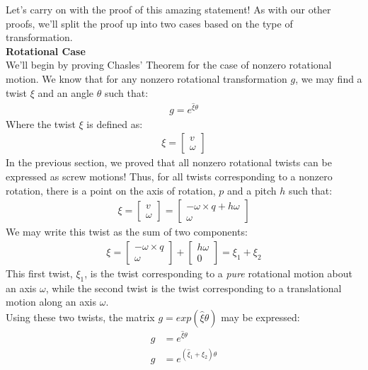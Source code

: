 \documentclass[oneside]{book}
\begin{document}
Let's carry on with the proof of this amazing statement! As with our other proofs, we'll split the proof up into two cases based on the type of transformation.\\
\textbf{Rotational Case}\\
We'll begin by proving Chasles' Theorem for the case of nonzero rotational motion. We know that for any nonzero rotational transformation $g$, we may find a twist $\xi$ and an angle $\theta$ such that:
\begin{align}
    g = e^{\hat\xi\theta}
\end{align}
Where the twist $\xi$ is defined as:
\begin{align}
    \xi = \begin{bmatrix}
    v\\
    \omega
    \end{bmatrix}
\end{align}
In the previous section, we proved that all nonzero rotational twists can be expressed as screw motions! Thus, for all twists corresponding to a nonzero rotation, there is a point on the axis of rotation, $p$ and a pitch $h$ such that:
\begin{align}
    \xi = \begin{bmatrix}
    v\\
    \omega
    \end{bmatrix} = 
    \begin{bmatrix}
    -\omega \times q + h\omega\\
    \omega
    \end{bmatrix}
\end{align}
We may write this twist as the sum of two components:
\begin{align}
    \xi = 
    \begin{bmatrix}
    -\omega \times q\\
    \omega
    \end{bmatrix}
    + \begin{bmatrix}
    h\omega\\
    0
    \end{bmatrix}
    = \xi_1 + \xi_2
\end{align}
This first twist, $\xi_1$, is the twist corresponding to a \textit{pure} rotational motion about an axis $\omega$, while the second twist is the twist corresponding to a translational motion along an axis $\omega$.\\
Using these two twists, the matrix $g = exp(\hat\xi\theta)$ may be expressed:
\begin{align}
    g &= e^{\hat\xi\theta}\\
    g &= e^{(\hat\xi_1 + \hat\xi_2)\theta}
\end{align}
\end{document}
